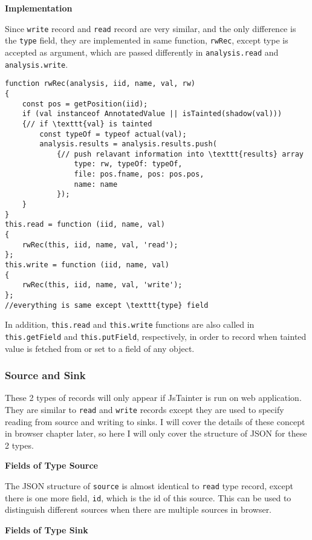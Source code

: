 \textbf{Implementation}

Since \texttt{write} record and \texttt{read} record are very similar, and the only difference is the \texttt{type} field, they are implemented in same function, \texttt{rwRec}, except type is accepted as argument, which are passed differently in \texttt{analysis.read} and \texttt{analysis.write}.

\begin{verbatim}
function rwRec(analysis, iid, name, val, rw)
{
    const pos = getPosition(iid);
    if (val instanceof AnnotatedValue || isTainted(shadow(val)))
    {// if \texttt{val} is tainted
        const typeOf = typeof actual(val);
        analysis.results = analysis.results.push(
            {// push relavant information into \texttt{results} array
                type: rw, typeOf: typeOf,
                file: pos.fname, pos: pos.pos,
                name: name
            });
    }
}
this.read = function (iid, name, val)
{
    rwRec(this, iid, name, val, 'read');
};
this.write = function (iid, name, val)
{
    rwRec(this, iid, name, val, 'write');
};
//everything is same except \texttt{type} field
\end{verbatim}

In addition, \texttt{this.read} and \texttt{this.write} functions are also called in \texttt{this.getField} and \texttt{this.putField}, respectively, in order to record when tainted value is fetched from or set to a field of any object.

\subsubsection{Source and Sink}

These 2 types of records will only appear if JsTainter is run on web application. They are similar to \texttt{read} and \texttt{write} records except they are used to specify reading from source and writing to sinks. I will cover the details of these concept in browser chapter later, so here I will only cover the structure of JSON for these 2 types.

\textbf{Fields of Type Source}

The JSON structure of \texttt{source} is almost identical to \texttt{read} type record, except there is one more field, \texttt{id}, which is the id of this source. This can be used to distinguish different sources when there are multiple sources in browser.

\textbf{Fields of Type Sink}


